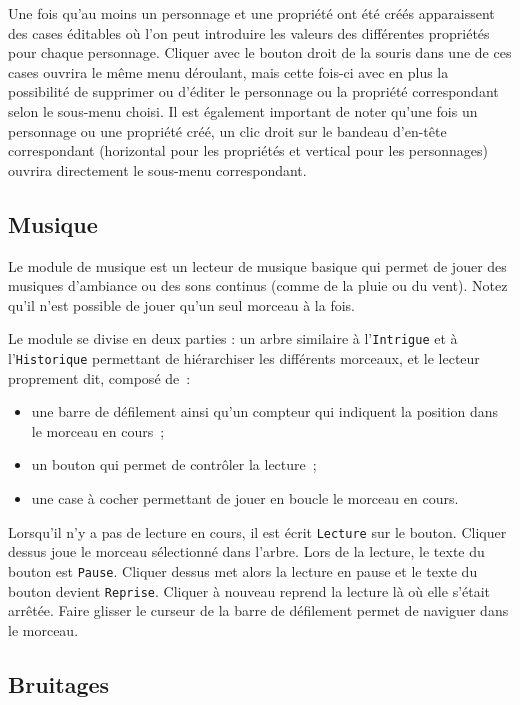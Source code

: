 \documentclass[a4paper,12pt]{article}
\newcommand*{\interfaceitem}[1]{\texttt{#1}}
\begin{document}
Une fois qu'au moins un personnage et une propriété ont été créés apparaissent des cases éditables où l'on peut introduire les valeurs des différentes propriétés pour chaque personnage.
Cliquer avec le bouton droit de la souris dans une de ces cases ouvrira le même menu déroulant, mais cette fois-ci avec en plus la possibilité de supprimer ou d'éditer le personnage ou la propriété correspondant selon le sous-menu choisi.
Il est également important de noter qu'une fois un personnage ou une propriété créé, un clic droit sur le bandeau d'en-tête correspondant (horizontal pour les propriétés et vertical pour les personnages) ouvrira directement le sous-menu correspondant.

\subsection{Musique}
\label{sec:musique}

Le module de musique est un lecteur de musique basique qui permet de jouer des musiques d'ambiance ou des sons continus (comme de la pluie ou du vent).
Notez qu'il n'est possible de jouer qu'un seul morceau à la fois.

Le module se divise en deux parties : un arbre similaire à l'\interfaceitem{Intrigue} et à l'\interfaceitem{Historique} permettant de hiérarchiser les différents morceaux, et le lecteur proprement dit, composé de~:
\begin{itemize}
    \item une barre de défilement ainsi qu'un compteur qui indiquent la position dans le morceau en cours~;
    \item un bouton qui permet de contrôler la lecture~;
    \item une case à cocher permettant de jouer en boucle le morceau en cours.
\end{itemize}
Lorsqu'il n'y a pas de lecture en cours, il est écrit \interfaceitem{Lecture} sur le bouton.
Cliquer dessus joue le morceau sélectionné dans l'arbre.
Lors de la lecture, le texte du bouton est \interfaceitem{Pause}.
Cliquer dessus met alors la lecture en pause et le texte du bouton devient \interfaceitem{Reprise}.
Cliquer à nouveau reprend la lecture là où elle s'était arrêtée.
Faire glisser le curseur de la barre de défilement permet de naviguer dans le morceau.

\subsection{Bruitages}
\label{sec:bruitages}
\end{document}
